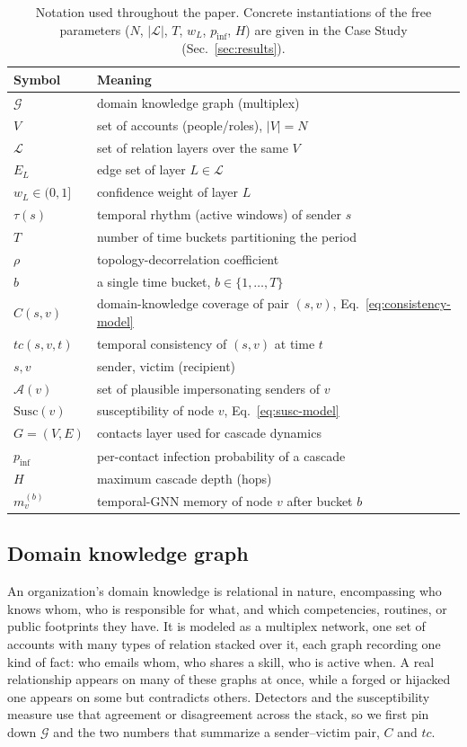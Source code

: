 \begin{table}[t]\centering\small
\caption{Notation used throughout the paper. Concrete instantiations of the free
parameters ($N$, $|\mathcal{L}|$, $T$, $w_L$, $p_\mathrm{inf}$, $H$) are given in
the Case Study (Sec.~\ref{sec:results}).}
\label{tab:notation}
\begin{tabular}{ll}
\toprule
\textbf{Symbol} & \textbf{Meaning} \\
\midrule
$\mathcal{G}$ & domain knowledge graph (multiplex) \\
$V$ & set of accounts (people/roles), $|V|=N$ \\
$\mathcal{L}$ & set of relation layers over the same $V$ \\
$E_L$ & edge set of layer $L\in\mathcal{L}$ \\
$w_L\in(0,1]$ & confidence weight of layer $L$ \\
$\tau(s)$ & temporal rhythm (active windows) of sender $s$ \\
$T$ & number of time buckets partitioning the period \\
$\rho$ & topology-decorrelation coefficient \\
$b$ & a single time bucket, $b\in\{1,\dots,T\}$ \\
$C(s,v)$ & domain-knowledge coverage of pair $(s,v)$, Eq.~\eqref{eq:consistency-model} \\
$tc(s,v,t)$ & temporal consistency of $(s,v)$ at time $t$ \\
$s,v$ & sender, victim (recipient) \\
$\mathcal{A}(v)$ & set of plausible impersonating senders of $v$ \\
$\mathrm{Susc}(v)$ & susceptibility of node $v$, Eq.~\eqref{eq:susc-model} \\
$G=(V,E)$ & contacts layer used for cascade dynamics \\
$p_\mathrm{inf}$ & per-contact infection probability of a cascade \\
$H$ & maximum cascade depth (hops) \\
$m_v^{(b)}$ & temporal-GNN memory of node $v$ after bucket $b$ \\
\bottomrule
\end{tabular}
\end{table}

\subsection{Domain knowledge graph}
\label{sec:dkg}
An organization's domain knowledge is relational in nature, encompassing who knows whom, who is responsible for what, and which
competencies, routines, or public footprints they have. It is modeled as a multiplex network, one set of
accounts with many types of relation stacked over it, each graph recording one kind of fact: who emails whom,
who shares a skill, who is active when. A real relationship appears on many of these graphs at once, while a forged or hijacked one appears on some but contradicts others. Detectors and the
susceptibility measure use that agreement or disagreement across the stack, so we first pin down
$\mathcal{G}$ and the two numbers that summarize a sender--victim pair, $C$ and $tc$.

